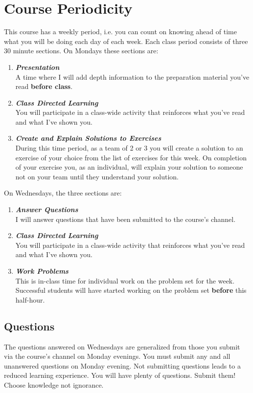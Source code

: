 \documentclass[12pt]{amsart}
\begin{document}
\section{Course Periodicity}
This course has a weekly period, i.e. you can count on knowing ahead of time what you will be doing each day of each week.
Each class period consists of three 30 minute sections. On Mondays these sections are:
\begin{enumerate}
	\item \textit{\textbf{Presentation}} \\A time where I will add depth information to the preparation material you've read \textbf{before class}. 
	\item \textit{\textbf{Class Directed Learning}}\\You will participate in a class-wide activity that reinforces what you've read and what I've shown you.
	\item \textit{\textbf{Create and Explain Solutions to Exercises}}\\During this time period, as a team of 2 or 3 you will create a solution to an exercise of your choice from the list of exercises for this week. On completion of your exercise you, as an individual, will explain your solution to someone not on your team until they understand your solution.
\end{enumerate}
On Wednesdays, the three sections are:
\begin{enumerate}
	\item \textit{\textbf{Answer Questions}}\\ I will answer questions that have been submitted to the course's channel.
	\item \textit{\textbf{Class Directed Learning}}\\You will participate in a class-wide activity that reinforces what you've read and what I've shown you.
	\item \textit{\textbf{Work Problems}}\\This is in-class time for individual work on the problem set for the week. Successful students will have started working on the problem set \textbf{before} this half-hour.
\end{enumerate}

\subsection{Questions} The questions answered on Wednesdays are generalized from those you submit via the course's channel on Monday evenings. You must submit any and all unanswered questions on Monday evening. Not submitting questions leads to a reduced learning experience. You will have plenty of questions. Submit them! Choose knowledge not ignorance.
\end{document}
